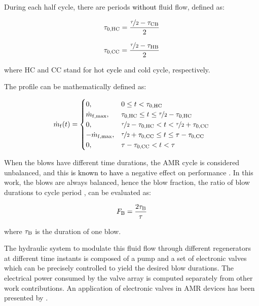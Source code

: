 \documentclass[referee]{svjour3}
\begin{document}
During each half cycle, there are periods \textcolor{black}{without}  fluid flow, defined as:

\begin{equation}
\label{eq:48}
\tau_{\mathrm{0,HC}} = \frac{\nicefrac{\tau}{2} - \tau_{\mathrm{CB}}}{2}
\end{equation}

\begin{equation}
\label{eq:49}
\tau_{\mathrm{0,CC}} = \frac{\nicefrac{\tau}{2} - \tau_{\mathrm{HB}}}{2}
\end{equation}

where HC and CC stand for hot \textcolor{black}{cycle} and cold cycle, respectively.


The profile can be mathematically defined as:

\begin{equation}
\dot{m}_{\mathrm{f}}(t)=
\begin{cases}
0, & 0 \le t < \tau_{\mathrm{0,HC}} \\
\dot{m}_{\mathrm{f,max}}, & \tau_{\mathrm{0,HC}} \le t \le \nicefrac{\tau}{2} - \tau_{\mathrm{0,HC}} \\
0, & \nicefrac{\tau}{2} - \tau_{\mathrm{0,HC}} < t < \nicefrac{\tau}{2} + \tau_{\mathrm{0,CC}} \\
-\dot{m}_{\mathrm{f,max}}, & \nicefrac{\tau}{2} + \tau_{\mathrm{0,CC}} \le t \le \tau - \tau_{\mathrm{0,CC}} \\
0, &  \tau - \tau_{\mathrm{0,CC}} <  t < \tau \\
\end{cases}
\label{eq:50}
\end{equation}

When the blows have different time durations, the AMR cycle is considered unbalanced, and this \textcolor{black}{is known to have} a negative effect on performance \cite{bib:eriksen16_effec,bib:nakashima18-influen-exp}. In this work, the blows are always balanced, hence the blow fraction, the ratio of blow durations to cycle period \cite{bib:nakashima18-influen-exp}, can be evaluated as:

\begin{equation}
\label{eq:59}
F_{\mathrm{B}} = \frac{2\tau_{\mathrm{B}}}{\tau}
\end{equation}

\noindent where $\tau_{\mathrm{B}}$ is the duration of one blow.


The hydraulic system to modulate this fluid flow through different regenerators at different time instants is composed of a pump and a set of electronic valves which can be precisely controlled to yield the desired blow durations. The electrical power consumed by the valve array is computed separately from other work contributions. An application of electronic valves in AMR devices has been presented by \cite{bib:nakashima18-perfor-asses-solen-valves-flow}.
\end{document}
